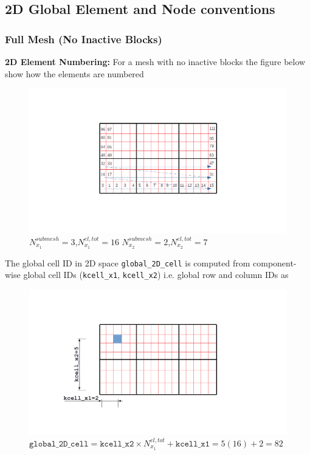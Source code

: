 \documentclass[a4paper,12pt]{article}
\begin{document}
\subsection{2D Global Element and Node conventions}
\subsubsection{Full Mesh (No Inactive Blocks)}
\textbf{2D Element Numbering:}  For a mesh with no inactive blocks the figure below show how the elements are numbered
\begin{figure}[H]
	\centering
	\includegraphics[trim=140 100 200 100,clip,scale=0.35]{figures/FullMesh_ElemNumbered.png}
	\caption{$N^{submesh}_{x_1}=3$,$N_{x_1}^{el,tot}=16$        $N^{submesh}_{x_2}=2$,$N_{x_2}^{el,tot}=7$}			
\end{figure}
The global cell ID in 2D space \texttt{global\_2D\_cell} is computed from component-wise global cell IDs (\texttt{kcell\_x1}, \texttt{kcell\_x2}) i.e. global row and column IDs as
\begin{figure}[H]
	\centering
	\includegraphics[trim=140 100 200  100,clip,scale=0.35]{figures/FullMesh_ElemIDCalc.png}
	\caption{$\texttt{global\_2D\_cell} = \texttt{kcell\_x2}\times N_{x_1}^{el,tot}+\texttt{kcell\_x1} = 5(16)+2 = 82$}			
\end{figure}
\end{document}
